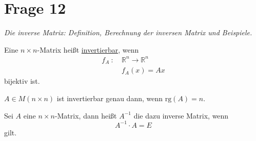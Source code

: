 \section{Frage 12}
\textit{Die inverse Matrix: Definition, Berechnung der inversen Matrix und Beispiele.}
\begin{definition}
    Eine $n\times n$-Matrix heißt \underline{invertierbar}, wenn
    \begin{align*}
        f_A\ :\ &\mathbb{R}^n \to \mathbb{R}^n\\
        & f_A(x) = Ax
    \end{align*}
    bijektiv ist.
\end{definition}
\begin{corollary}
    $A\in M(n\times n)$ ist invertierbar genau dann, wenn $\text{rg}(A)=n$.
\end{corollary}
\begin{definition}
    Sei $A$ eine $n\times n$-Matrix, dann heißt $A^{-1}$ die dazu inverse Matrix, wenn
    \[
        A^{-1}\cdot A = E
    \]
    gilt.
\end{definition}
